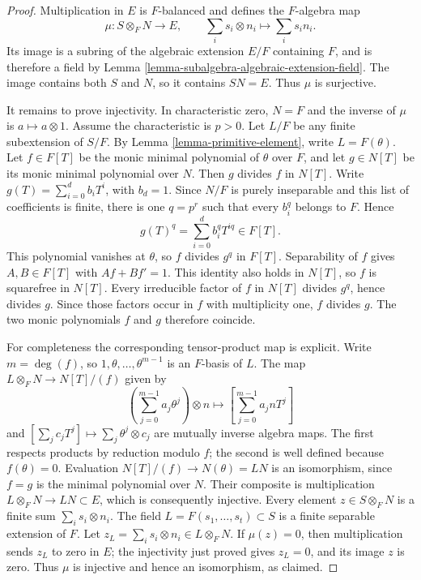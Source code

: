 \begin{proof}
\medskip\noindent
Multiplication in $E$ is $F$-balanced and defines the $F$-algebra map
$$
\mu:S\otimes_F N\longrightarrow E,\qquad
\sum_i s_i\otimes n_i\longmapsto\sum_i s_i n_i.
$$
Its image is a subring of the algebraic extension $E/F$ containing $F$,
and is therefore a field by Lemma \ref{lemma-subalgebra-algebraic-extension-field}.
The image contains both $S$ and $N$, so it contains $SN=E$.
Thus $\mu$ is surjective.

\medskip\noindent
It remains to prove injectivity. In characteristic zero, $N=F$ and
the inverse of $\mu$ is $a\mapsto a\otimes 1$.
Assume the characteristic is $p>0$. Let $L/F$ be any finite
subextension of $S/F$. By Lemma \ref{lemma-primitive-element},
write $L=F(\theta)$. Let $f\in F[T]$ be the monic minimal polynomial
of $\theta$ over $F$, and let $g\in N[T]$ be its monic minimal
polynomial over $N$. Then $g$ divides $f$ in $N[T]$.
Write $g(T)=\sum_{i=0}^d b_iT^i$, with $b_d=1$.
Since $N/F$ is purely inseparable and this list of coefficients is finite,
there is one $q=p^r$ such that every $b_i^q$ belongs to $F$. Hence
$$
g(T)^q=\sum_{i=0}^d b_i^q T^{iq}\in F[T].
$$
This polynomial vanishes at $\theta$, so $f$ divides $g^q$ in $F[T]$.
Separability of $f$ gives $A,B\in F[T]$ with $Af+Bf'=1$.
This identity also holds in $N[T]$, so $f$ is squarefree in $N[T]$.
Every irreducible factor of $f$ in $N[T]$ divides $g^q$, hence divides $g$.
Since those factors occur in $f$ with multiplicity one, $f$ divides $g$.
The two monic polynomials $f$ and $g$ therefore coincide.

\medskip\noindent
For completeness the corresponding tensor-product map is explicit.
Write $m=\deg(f)$, so $1,\theta,\ldots,\theta^{m-1}$ is an $F$-basis of $L$.
The map $L\otimes_F N\longrightarrow N[T]/(f)$ given by
$$
\left(\sum_{j=0}^{m-1}a_j\theta^j\right)\otimes n
\longmapsto\left[\sum_{j=0}^{m-1}a_j n T^j\right]
$$
and $[\sum_j c_jT^j]\mapsto\sum_j\theta^j\otimes c_j$
are mutually inverse algebra maps. The first respects products by reduction
modulo $f$; the second is well defined because $f(\theta)=0$.
Evaluation $N[T]/(f)\to N(\theta)=LN$ is an isomorphism, since $f=g$
is the minimal polynomial over $N$. Their composite is multiplication
$L\otimes_F N\to LN\subset E$, which is consequently injective.
Every element $z\in S\otimes_F N$ is a finite sum $\sum_i s_i\otimes n_i$.
The field $L=F(s_1,\ldots,s_t)\subset S$ is a finite separable extension
of $F$. Let $z_L=\sum_i s_i\otimes n_i\in L\otimes_F N$.
If $\mu(z)=0$, then multiplication sends $z_L$ to zero in $E$;
the injectivity just proved gives $z_L=0$, and its image $z$ is zero.
Thus $\mu$ is injective and hence an isomorphism, as claimed.
\end{proof}









